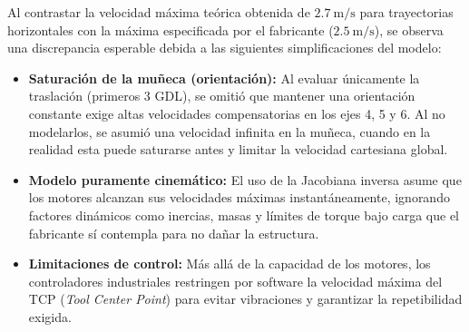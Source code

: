 Al contrastar la velocidad máxima teórica obtenida de $\qty{2.7}{\meter\per\second}$ para trayectorias horizontales con la máxima especificada por el fabricante ($\qty{2.5}{\meter\per\second}$), se observa una discrepancia esperable debida a las siguientes simplificaciones del modelo:

\begin{itemize}
	\item \textbf{Saturación de la muñeca (orientación):} Al evaluar únicamente la traslación (primeros 3 GDL), se omitió que mantener una orientación constante exige altas velocidades compensatorias en los ejes 4, 5 y 6. Al no modelarlos, se asumió una velocidad infinita en la muñeca, cuando en la realidad esta puede saturarse antes y limitar la velocidad cartesiana global.

	\item \textbf{Modelo puramente cinemático:} El uso de la Jacobiana inversa asume que los motores alcanzan sus velocidades máximas instantáneamente, ignorando factores dinámicos como inercias, masas y límites de torque bajo carga que el fabricante sí contempla para no dañar la estructura.

	\item \textbf{Limitaciones de control:} Más allá de la capacidad de los motores, los controladores industriales restringen por software la velocidad máxima del TCP (\textit{Tool Center Point}) para evitar vibraciones y garantizar la repetibilidad exigida.
\end{itemize}

\clearpage